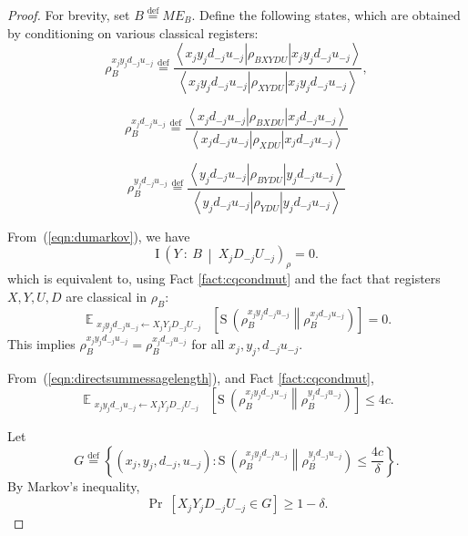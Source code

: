 \documentclass[11pt,a4paper]{article}
\theoremstyle{plain}
\theoremstyle{definition}
\newcommand {\br} [1] {\ensuremath{ \left( #1 \right) }}
\newcommand {\Br} [1] {\ensuremath{ \left[ #1 \right] }}
\newcommand {\minusspace} {\: \! \!}
\newcommand {\smallspace} {\: \!}
\newcommand {\fn} [2] {\ensuremath{ #1 \minusspace \br{ #2 } }}
\newcommand {\Fn} [2] {\ensuremath{ #1 \minusspace \Br{ #2 } }}
\newcommand {\defeq} {\ensuremath{ \stackrel{\mathrm{def}}{=} }}
\newcommand {\mutinf} [2] {\fn{\mathrm{I}}{#1 \smallspace : \smallspace #2}}
\newcommand {\condmutinf} [3] {\mutinf{#1}{#2 \smallspace \middle\vert \smallspace #3}}
\newcommand {\prob} [1] {\Fn{\Pr}{#1}}
\newcommand {\relent} [2] {\fn{\mathrm{S}}{#1 \middle\| #2}}
\DeclareMathOperator*{\bigE}{\mathbb{E}}
\newcommand {\expec} [2] {\Fn{\bigE_{\substack{#1}}}{#2}}
\newcommand {\bra} [1] {\ensuremath{ \left\langle #1 \right| }}
\newcommand {\ket} [1] {\ensuremath{ \left| #1 \right\rangle }}
\newcommand {\set} [1] {\ensuremath{ \left\lbrace #1 \right\rbrace }}
\begin{document}
\begin{proof}
For brevity, set $B\defeq ME_B$. Define the following states, which are obtained by conditioning on various classical registers: $$\rho_B^{x_jy_jd_{-j}u_{-j}}\defeq \frac{\bra{x_jy_jd_{-j}u_{-j}}\rho_{BXYDU}\ket{x_jy_jd_{-j}u_{-j}}}{\bra{x_jy_jd_{-j}u_{-j}}\rho_{XYDU}\ket{x_jy_jd_{-j}u_{-j}}},$$

$$\rho_B^{x_jd_{-j}u_{-j}}\defeq \frac{\bra{x_jd_{-j}u_{-j}}\rho_{BXDU}\ket{x_jd_{-j}u_{-j}}}{\bra{x_jd_{-j}u_{-j}}\rho_{XDU}\ket{x_jd_{-j}u_{-j}}}$$

$$\rho_B^{y_jd_{-j}u_{-j}}\defeq \frac{\bra{y_jd_{-j}u_{-j}}\rho_{BYDU}\ket{y_jd_{-j}u_{-j}}}{\bra{y_jd_{-j}u_{-j}}\rho_{YDU}\ket{y_jd_{-j}u_{-j}}}$$

From~(\ref{eqn:dumarkov}), we have
\[\condmutinf{Y}{B}{X_jD_{-j}U_{-j}}_{\rho}=0.\]
which is equivalent to, using Fact \ref{fact:cqcondmut} and the fact that registers $X,Y,U,D$ are classical in $\rho_B$: 
$$\expec{x_jy_jd_{-j}u_{-j}\leftarrow X_jY_jD_{-j}U_{-j}}{\relent{\rho_B^{x_jy_jd_{-j}u_{-j}}}{\rho_B^{x_jd_{-j}u_{-j}}}}=0.$$ This implies $\rho_B^{x_jy_jd_{-j}u_{-j}}=\rho_B^{x_jd_{-j}u_{-j}}$ for all $x_j,y_j,d_{-j}u_{-j}$. 

From~(\ref{eqn:directsummessagelength}), and Fact \ref{fact:cqcondmut},
$$\expec{x_jy_jd_{-j}u_{-j}\leftarrow X_jY_jD_{-j}U_{-j}}{\relent{\rho_B^{x_jy_jd_{-j}u_{-j}}}{\rho_B^{y_jd_{-j}u_{-j}}}}\leq 4c.$$ 

Let 
$$G\defeq\set{(x_j,y_j,d_{-j},u_{-j}):\relent{\rho_B^{x_jy_jd_{-j}u_{-j}}}{\rho_B^{y_jd_{-j}u_{-j}}}\leq \frac{4c}{\delta}}.$$ By Markov's inequality, 
$$\prob{X_jY_jD_{-j}U_{-j}\in G}\geq1-\delta. $$


\end{proof}
\end{document}
